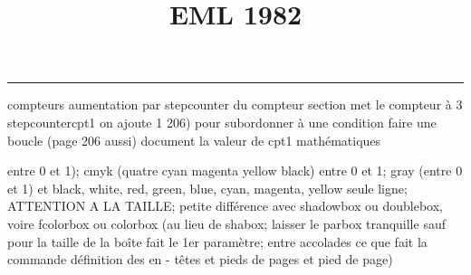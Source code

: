 \documentclass[11pt]{article}%
\title{\bf \vspace{- 2cm} EML 1982} %
\author{} %
\date{} %
\renewcommand{\headrulewidth}{0pt}%
\renewcommand{\footrulewidth}{0.4pt}%
\begin{document}
\maketitle %
\vspace{- 1.4cm}\hrule %
\thispagestyle{fancy}

\vspace*{.2cm}



compteurs%
aumentation par stepcounter du compteur section%
met le compteur à 3%
stepcounter{cpt1} on ajoute 1%
206) pour subordonner à une condition %
faire une boucle (page 206 aussi) %
document la valeur de cpt1 
mathématiques\newcommand{\ch}{\operatorname{ch}} 
\newcommand{\sh}{\operatorname{sh}}
\renewcommand{\tanh}{\operatorname{th}}
\renewcommand{\sinh}{\operatorname{sh}}
\renewcommand{\cosh}{\operatorname{ch}}
\newcommand{\argsh}{\operatorname{argsh}}
\newcommand{\argch}{\operatorname{argch}}
\newcommand{\argth}{\operatorname{argth}}
\newcommand{\ker}{\operatorname{Ker}}
\renewcommand{\im}{\operatorname{Im}}
\newcommand{\rg}{\operatorname{rg}}
\newcommand{\Id}{\operatorname{Id}}
\newcommand{\id}{\operatorname{id}}
\renewcommand{\leq}{\leq}
\renewcommand{\geq}{\geq }

entre 0 et 1); cmyk (quatre cyan magenta yellow black) entre 0 et 1;
gray (entre 0 et 1) et black, white, red, green, blue, cyan, magenta,
yellow%
seule ligne; ATTENTION A LA TAILLE; petite différence avec shadowbox ou
doublebox, voire fcolorbox ou colorbox (au lieu de shabox; laisser le
parbox tranquille sauf pour la taille de la boîte
\newcommand{\Tbox}[1]{\begin{center} \shabox{\parbox{0.6
\linewidth}{#1}} \end{center}} %
fait le 1er paramètre; entre accolades ce que fait la commande
définition des en - têtes et pieds de pages\pagestyle{fancy}
\chead{}
\rfoot[ \ \thepage]{\thepage}
\cfoot{}
\lfoot{}
\thispagestyle{fancy} %
et pied de page)\renewcommand{\footrulewidth}{0.4pt}
\renewcommand{\headrulewidth}{0.4pt}
\end{document}
